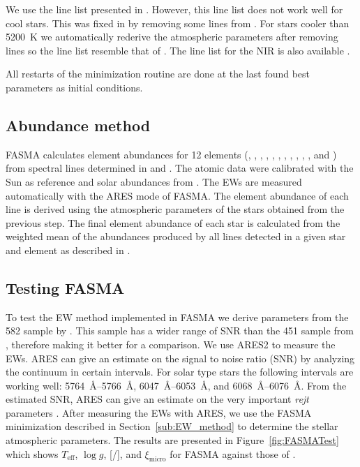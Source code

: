 \documentclass{aa}
\begin{document}
We use the line list presented in \citet{Sousa2008a}. However, this line list
does not work well for cool stars. This was fixed in \citet{Tsantaki2013} by
removing some lines from \citet{Sousa2008a}. For stars cooler than \SI{5200}{K}
we automatically rederive the atmospheric parameters after removing lines so the
line list resemble that of \citet{Tsantaki2013}. The line list for the NIR is
also available \citep{Andreasen2016}.

All restarts of the minimization routine are done at the last found best
parameters as initial conditions.


\subsection{Abundance method}
\label{sub:Abundance_method}

FASMA calculates element abundances for 12 elements (, ,
, , , , , ,
, , , and ) from spectral lines
determined in \citet{Neves2009} and \citet{Adibekyan2012}. The atomic data were
calibrated with the Sun as reference and solar abundances from
\citet{Anders1989}. The EWs are measured automatically with the ARES mode of
FASMA. The element abundance of each line is derived using the atmospheric
parameters of the stars obtained from the previous step. The final element
abundance of each star is calculated from the weighted mean of the abundances
produced by all lines detected in a given star and element as described in
\citet{Adibekyan2015b}.


\subsection{Testing FASMA}
\label{sub:Testing_FASMA}
To test the EW method implemented in FASMA we derive parameters from the 582
sample by \citet{Sousa2011}. This sample has a wider range of SNR than the 451
sample from \citet{Tsantaki2013}, therefore making it better for a comparison.
We use ARES2 to measure the EWs. ARES can give an estimate on the signal to
noise ratio (SNR) by analyzing the continuum in certain intervals. For solar
type stars the following intervals are working well:
\SIrange{5764}{5766}{\angstrom}, \SIrange{6047}{6053}{\angstrom}, and
\SIrange{6068}{6076}{\angstrom}. From the estimated SNR, ARES can give an
estimate on the very important \emph{rejt} parameters \citep[see][for more
information]{Sousa2015a}. After measuring the EWs with ARES, we use the FASMA
minimization described in Section~\ref{sub:EW_method} to determine the stellar
atmospheric parameters. The results are presented in Figure~\ref{fig:FASMATest}
which shows $T_\mathrm{eff}$, $\log g$, [/], and
$\xi_\mathrm{micro}$ for FASMA against those of \citet{Sousa2011}.
\end{document}
